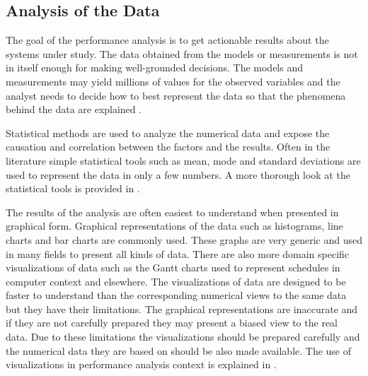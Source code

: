 \subsection{Analysis of the Data}
The goal of the performance analysis is to get actionable results about the systems under study. The data obtained from the models or measurements is not in itself enough for making well-grounded decisions. The models and measurements may yield millions of values for the observed variables and the analyst needs to decide how to best represent the data so that the phenomena behind the data are explained \cite{jain1991art}.

Statistical methods are used to analyze the numerical data and expose the causation and correlation between the factors and the results. Often in the literature simple statistical tools such as mean, mode and standard deviations are used to represent the data in only a few numbers. A more thorough look at the statistical tools is provided in \cite{jain1991art}.  

The results of the analysis are often easiest to understand when presented in graphical form. Graphical representations of the data such as histograms, line charts and bar charts are commonly used. These graphs are very generic and used in many fields to present all kinds of data. There are also more domain specific visualizations of data such as the Gantt charts used to represent schedules in computer context and elsewhere. The visualizations of data are designed to be faster to understand than the corresponding numerical views to the same data but they have their limitations. The graphical representations are inaccurate and if they are not carefully prepared they may present a biased view to the real data. Due to these limitations the visualizations should be prepared carefully and the numerical data they are based on should be also made available. The use of visualizations in performance analysis context is explained in \cite{jain1991art}. 

